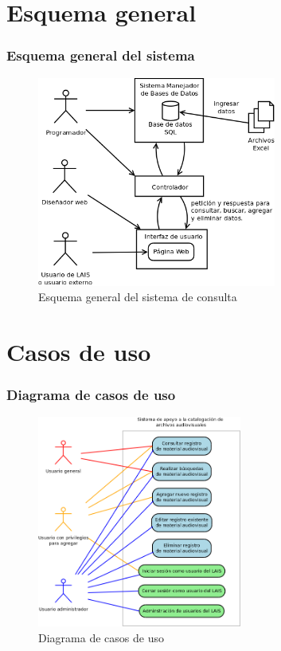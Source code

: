 \documentclass{beamer}
\begin{document}
\section{Esquema general}
\begin{frame}
	\frametitle{Esquema general del sistema}
	\begin{figure}[H]
		\centering
		\includegraphics[width=0.7\textwidth]{EsquemaGeneral.png}
		\caption{Esquema general del sistema de consulta}
		\label{fig:esquema_general}
	\end{figure}
\end{frame}

\section{Casos de uso}
\begin{frame}
	\frametitle{Diagrama de casos de uso}
	\begin{figure}[H]
		\centering
		\includegraphics[width=0.6\textwidth]{CasosDeUso.png}
		\caption{Diagrama de casos de uso}
		\label{fig:caso_de_uso}
	\end{figure}
\end{frame}
\end{document}
